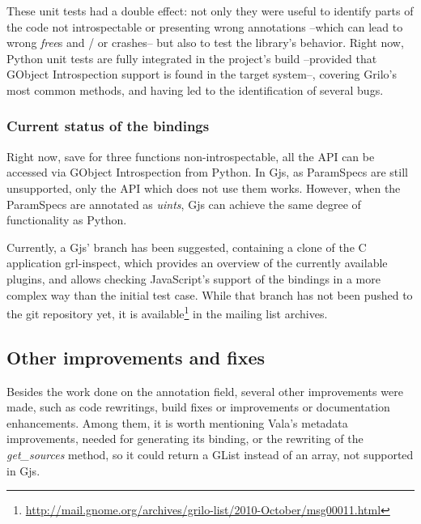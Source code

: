 These unit tests had a double effect: not only they were useful to identify parts
of the code not introspectable or presenting wrong annotations --which can lead
to wrong {\it free}s and / or crashes-- but also to test the library's behavior.
Right now, Python unit tests are fully integrated in the project's build --provided
that GObject Introspection support is found in the target system--, covering Grilo's
most common methods, and having led to the identification of several bugs.

\subsubsection{Current status of the bindings}

Right now, save for three functions non-introspectable, all the API can be accessed
via GObject Introspection from Python. In Gjs, as ParamSpecs are still unsupported, only the
API which does not use them works. However, when the ParamSpecs are annotated as {\it uints},
Gjs can achieve the same degree of functionality as Python.

Currently, a Gjs' branch has been suggested, containing a clone of the C application grl-inspect,
which provides an overview of the currently available plugins, and allows checking JavaScript's
support of the bindings in a more complex way than the initial test case.
While that branch has not been pushed to the git repository yet, it is available\footnote{\url{http://mail.gnome.org/archives/grilo-list/2010-October/msg00011.html}} in
the mailing list archives.

\subsection{Other improvements and fixes}

Besides the work done on the annotation field, several other improvements were made, such as
code rewritings, build fixes or improvements or documentation enhancements. Among them,
it is worth mentioning Vala's metadata improvements, needed for generating its binding, or
the rewriting of the {\it get\_sources} method, so it could return a GList instead of an array,
not supported in Gjs.

